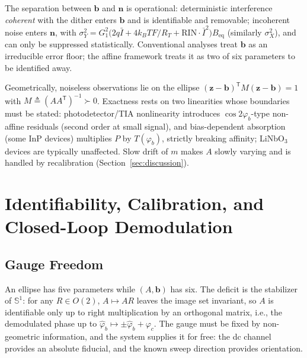\documentclass[journal]{IEEEtran}
\newcommand{\zv}{\mathbf{z}}
\newcommand{\bv}{\mathbf{b}}
\newcommand{\nv}{\mathbf{n}}
\newcommand{\T}{\mathsf{T}}
\begin{document}
The separation between $\bv$ and $\nv$ is operational: deterministic
interference \emph{coherent} with the dither enters $\bv$ and is
identifiable and removable; incoherent noise enters $\nv$, with
$\sigma_Y^2=G_1^2\bigl(2q\bar I+4k_BTF/R_T+\mathrm{RIN}\cdot\bar
I^2\bigr)B_{\mathrm{eq}}$ (similarly $\sigma_X^2$), and can only be
suppressed statistically. Conventional analyses treat $\bv$ as an
irreducible error floor; the affine framework treats it as two of six
parameters to be identified away.

Geometrically, noiseless observations lie on the ellipse
$(\zv-\bv)^{\T}M(\zv-\bv)=1$ with $M\triangleq(AA^{\T})^{-1}\succ0$.
Exactness rests on two linearities whose boundaries must be stated:
photodetector/TIA nonlinearity introduces
$\cos 2\varphi_b$-type non-affine residuals (second order at small
signal), and bias-dependent absorption (some InP devices) multiplies
$P$ by $T(\varphi_b)$, strictly breaking affinity; LiNbO$_3$ devices
are typically unaffected. Slow drift of $m$ makes $A$ slowly varying
and is handled by recalibration (Section~\ref{sec:discussion}).

\section{Identifiability, Calibration, and Closed-Loop Demodulation}
\label{sec:calib}

\subsection{Gauge Freedom}
An ellipse has five parameters while $(A,\bv)$ has six. The deficit is
the stabilizer of $\mathbb{S}^1$: for any $R\in O(2)$, $A\mapsto AR$
leaves the image set invariant, so $A$ is identifiable only up to right
multiplication by an orthogonal matrix, i.e., the demodulated phase up
to $\hat\varphi_b\mapsto\pm\hat\varphi_b+\varphi_c$. The gauge must be
fixed by non-geometric information, and the system supplies it for
free: the dc channel provides an absolute fiducial, and the known sweep
direction provides orientation.
\end{document}

